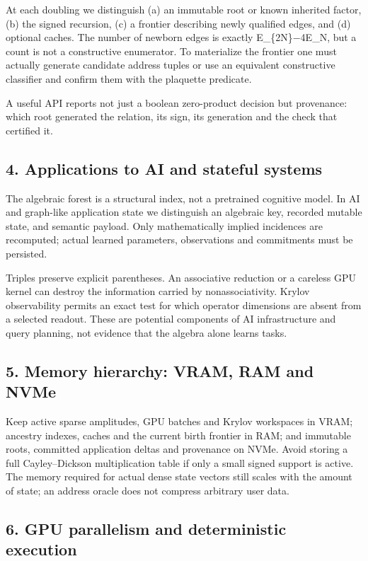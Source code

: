\documentclass[
  10pt,
]{article}
\begin{document}
At each doubling we distinguish (a) an immutable root or known inherited
factor, (b) the signed recursion, (c) a frontier describing newly
qualified edges, and (d) optional caches. The number of newborn edges is
exactly E\_\{2N\}−4E\_N, but a count is not a constructive enumerator.
To materialize the frontier one must actually generate candidate address
tuples or use an equivalent constructive classifier and confirm them
with the plaquette predicate.

A useful API reports not just a boolean zero-product decision but
provenance: which root generated the relation, its sign, its generation
and the check that certified it.

\subsection{4. Applications to AI and stateful
systems}\label{applications-to-ai-and-stateful-systems}

The algebraic forest is a structural index, not a pretrained cognitive
model. In AI and graph-like application state we distinguish an
algebraic key, recorded mutable state, and semantic payload. Only
mathematically implied incidences are recomputed; actual learned
parameters, observations and commitments must be persisted.

Triples preserve explicit parentheses. An associative reduction or a
careless GPU kernel can destroy the information carried by
nonassociativity. Krylov observability permits an exact test for which
operator dimensions are absent from a selected readout. These are
potential components of AI infrastructure and query planning, not
evidence that the algebra alone learns tasks.

\subsection{5. Memory hierarchy: VRAM, RAM and
NVMe}\label{memory-hierarchy-vram-ram-and-nvme}

Keep active sparse amplitudes, GPU batches and Krylov workspaces in
VRAM; ancestry indexes, caches and the current birth frontier in RAM;
and immutable roots, committed application deltas and provenance on
NVMe. Avoid storing a full Cayley--Dickson multiplication table if only
a small signed support is active. The memory required for actual dense
state vectors still scales with the amount of state; an address oracle
does not compress arbitrary user data.

\subsection{6. GPU parallelism and deterministic
execution}\label{gpu-parallelism-and-deterministic-execution}
\end{document}
